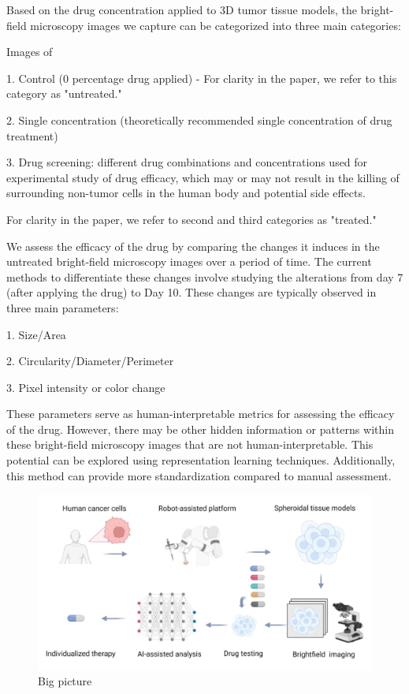 \documentclass[12pt,twoside,a4paper,parskip]{scrbook} %
\begin{document}
Based on the drug concentration applied to 3D tumor tissue models, the bright-field microscopy images we capture can be categorized into three main categories:

Images of

1. Control (0 percentage drug applied) - For clarity in the paper, we refer to this category as "untreated."

2. Single concentration (theoretically recommended single concentration of drug treatment)

3. Drug screening: different drug combinations and concentrations used for experimental study of drug efficacy, which may or may not result in the killing of surrounding non-tumor cells in the human body and potential side effects.

For clarity in the paper, we refer to second and third  categories as "treated."

We assess the efficacy of the drug by comparing the changes it induces in the untreated bright-field microscopy images over a period of time. The current methods to differentiate these changes involve studying the alterations from day 7 (after applying the drug) to Day 10. These changes are typically observed in three main parameters: 

1. Size/Area

2. Circularity/Diameter/Perimeter

3. Pixel intensity or color change

These parameters serve as human-interpretable metrics for assessing the efficacy of the drug. However, there may be other hidden information or patterns within these bright-field microscopy images that are not human-interpretable. This potential can be explored using representation learning techniques. Additionally, this method can provide more standardization compared to manual assessment.
\begin{figure}[H]
  \centering
  \includegraphics[scale=0.55]{figures/Big picture.jpg} 
  \caption{Big picture}

  \label{fig:output1}
\end{figure}
\let\cleardoublepage\clearpage
\end{document}
